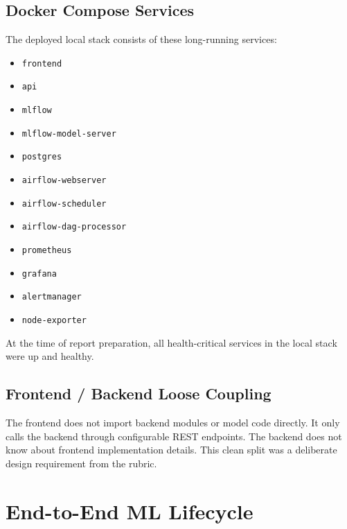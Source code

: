 \documentclass[11pt,a4paper]{article}
\begin{document}
\subsection{Docker Compose Services}

The deployed local stack consists of these long-running services:

\begin{itemize}[leftmargin=1.4em]
  \item \texttt{frontend}
  \item \texttt{api}
  \item \texttt{mlflow}
  \item \texttt{mlflow-model-server}
  \item \texttt{postgres}
  \item \texttt{airflow-webserver}
  \item \texttt{airflow-scheduler}
  \item \texttt{airflow-dag-processor}
  \item \texttt{prometheus}
  \item \texttt{grafana}
  \item \texttt{alertmanager}
  \item \texttt{node-exporter}
\end{itemize}

At the time of report preparation, all health-critical services in the local stack were up and healthy.

\subsection{Frontend / Backend Loose Coupling}

The frontend does not import backend modules or model code directly. It only calls the backend through configurable REST endpoints. The backend does not know about frontend implementation details. This clean split was a deliberate design requirement from the rubric.

\section{End-to-End ML Lifecycle}
\end{document}
